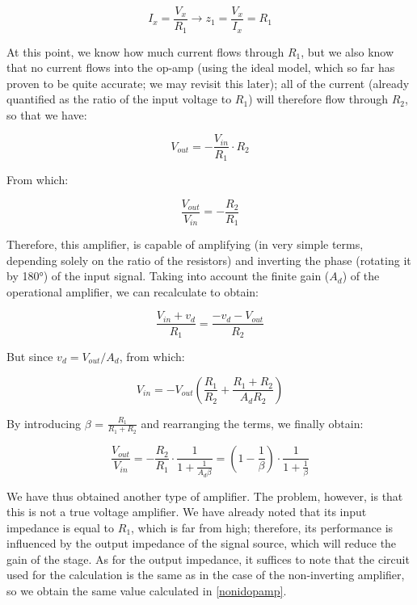 \documentclass[../main.tex]{subfiles}
\begin{document}
\begin{equation}
	I_x = \frac{V_x}{R_1} \rightarrow z_1 = \frac{V_x}{I_x} = R_1
\end{equation}


At this point, we know how much current flows through $R_1$, but we also know that no current flows into the op-amp (using the ideal model, which so far has proven to be quite accurate; we may revisit this later); all of the current (already quantified as the ratio of the input voltage to $R_1$) will therefore flow through $R_2$, so that we have:


\begin{equation}
	V_{out} = - \frac{V_{in}}{R_1} \cdot R_2
\end{equation}

From which:

\begin{equation}
	\frac{V_{out}}{V_{in}} = - \frac{R_2}{R_1}
\end{equation}

Therefore, this amplifier, is capable of amplifying (in very simple terms, depending solely on the ratio of the resistors) and inverting the phase (rotating it by 180°) of the input signal. Taking into account the finite gain ($A_d$) of the operational amplifier, we can recalculate to obtain:

\begin{equation}
\frac{V_{in} + v_d}{R_1} = \frac{-v_d - V_{out}}{R_2}
\end{equation}

But since $v_d = V_{out} / A_d$, from which:

\begin{equation}
	V_{in} = -V_{out} \left( \frac{R_1}{R_2} + \frac{R_1 + R_2}{A_dR_2} \right)
\end{equation}

By introducing $\beta$ = $\frac{R_1}{R_1 + R_2}$ and rearranging the terms, we finally obtain:

\begin{equation}
	\frac{V_{out}}{V_{in}} = - \frac{R_2}{R_1} \cdot \frac{1}{1 + \frac{1}{A_d \beta}} = \left( 1 - \frac{1}{\beta} \right) \cdot \frac{1}{1 + \frac{1}{\beta}}
\end{equation}


We have thus obtained another type of amplifier. The problem, however, is that this is not a true voltage amplifier. We have already noted that its input impedance is equal to $R_1$, which is far from high; therefore, its performance is influenced by the output impedance of the signal source, which will reduce the gain of the stage. 
As for the output impedance, it suffices to note that the circuit used for the calculation is the same as in the case of the non-inverting amplifier, so we obtain the same value calculated in \autoref{nonidopamp}.
\end{document}
